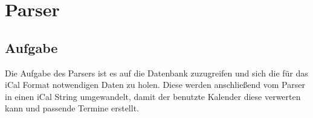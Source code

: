 
\renewcommand{\theauthor}{Dario Wagner}
\chapter{Parser}
\label{sec:parser}
\section{Aufgabe}
\label{sec:parser-aufgabe}
Die Aufgabe des Parsers ist es auf die Datenbank zuzugreifen und sich die für das iCal Format notwendigen Daten zu holen. Diese werden anschließend vom Parser in einen iCal String umgewandelt, damit der benutzte Kalender diese verwerten kann und passende Termine erstellt. 

